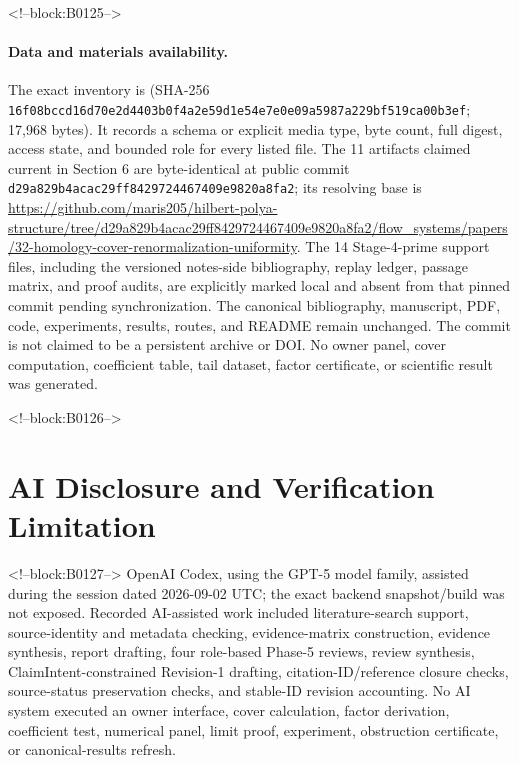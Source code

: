 \documentclass[11pt]{article}
\begin{document}
<!--block:B0125-->
\paragraph{Data and materials availability.}\begingroup\sloppy
The exact inventory is
 (SHA-256
\texttt{16f08bcc\allowbreak{}d16d70e2\allowbreak{}d4403b0f\allowbreak{}4a2e59d1\allowbreak{}e54e7e0e\allowbreak{}09a5987a\allowbreak{}229bf519\allowbreak{}ca00b3ef}; 17,968 bytes).  It records a schema or explicit media type,
byte count, full digest, access state, and bounded role for every listed file.
The 11 artifacts claimed current in Section 6 are byte-identical at public
commit \texttt{d29a829b4acac29ff8429724467409e9820a8fa2}; its resolving base is
\url{https://github.com/maris205/hilbert-polya-structure/tree/d29a829b4acac29ff8429724467409e9820a8fa2/flow_systems/papers/32-homology-cover-renormalization-uniformity}.
The 14 Stage-4-prime support files, including the versioned notes-side
bibliography, replay ledger, passage matrix, and proof audits, are explicitly
marked local and absent from that pinned commit pending synchronization.  The
canonical bibliography, manuscript, PDF, code, experiments, results, routes,
and README remain unchanged.  The commit is not claimed to be a persistent
archive or DOI.  No owner panel, cover computation, coefficient table, tail
dataset, factor certificate, or scientific result was generated.
\par\endgroup

<!--block:B0126-->
\hypertarget{ai-disclosure-and-verification-limitation}{%
\section*{AI Disclosure and Verification
Limitation}\label{ai-disclosure-and-verification-limitation}}

<!--block:B0127-->
OpenAI Codex, using the GPT-5 model family, assisted during the session
dated 2026-09-02 UTC; the exact backend snapshot/build was not exposed.
Recorded AI-assisted work included literature-search support,
source-identity and metadata checking, evidence-matrix construction,
evidence synthesis, report drafting, four role-based Phase-5 reviews,
review synthesis, ClaimIntent-constrained Revision-1 drafting,
citation-ID/reference closure checks, source-status preservation checks,
and stable-ID revision accounting. No AI system executed an owner
interface, cover calculation, factor derivation, coefficient test,
numerical panel, limit proof, experiment, obstruction certificate, or
canonical-results refresh.
\end{document}
